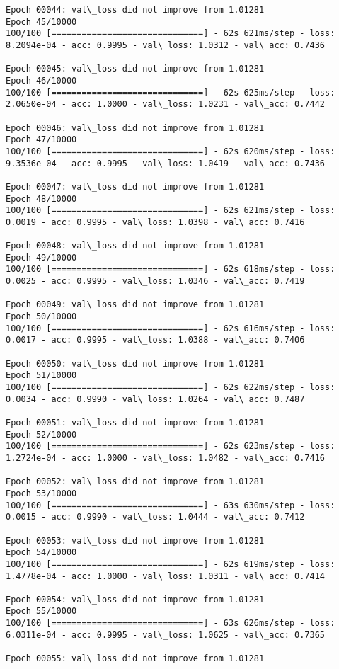 \documentclass[11pt]{article}
\begin{document}
\begin{Verbatim}[commandchars=\\\{\}]
Epoch 00044: val\_loss did not improve from 1.01281
Epoch 45/10000
100/100 [==============================] - 62s 621ms/step - loss: 8.2094e-04 - acc: 0.9995 - val\_loss: 1.0312 - val\_acc: 0.7436

Epoch 00045: val\_loss did not improve from 1.01281
Epoch 46/10000
100/100 [==============================] - 62s 625ms/step - loss: 2.0650e-04 - acc: 1.0000 - val\_loss: 1.0231 - val\_acc: 0.7442

Epoch 00046: val\_loss did not improve from 1.01281
Epoch 47/10000
100/100 [==============================] - 62s 620ms/step - loss: 9.3536e-04 - acc: 0.9995 - val\_loss: 1.0419 - val\_acc: 0.7436

Epoch 00047: val\_loss did not improve from 1.01281
Epoch 48/10000
100/100 [==============================] - 62s 621ms/step - loss: 0.0019 - acc: 0.9995 - val\_loss: 1.0398 - val\_acc: 0.7416

Epoch 00048: val\_loss did not improve from 1.01281
Epoch 49/10000
100/100 [==============================] - 62s 618ms/step - loss: 0.0025 - acc: 0.9995 - val\_loss: 1.0346 - val\_acc: 0.7419

Epoch 00049: val\_loss did not improve from 1.01281
Epoch 50/10000
100/100 [==============================] - 62s 616ms/step - loss: 0.0017 - acc: 0.9995 - val\_loss: 1.0388 - val\_acc: 0.7406

Epoch 00050: val\_loss did not improve from 1.01281
Epoch 51/10000
100/100 [==============================] - 62s 622ms/step - loss: 0.0034 - acc: 0.9990 - val\_loss: 1.0264 - val\_acc: 0.7487

Epoch 00051: val\_loss did not improve from 1.01281
Epoch 52/10000
100/100 [==============================] - 62s 623ms/step - loss: 1.2724e-04 - acc: 1.0000 - val\_loss: 1.0482 - val\_acc: 0.7416

Epoch 00052: val\_loss did not improve from 1.01281
Epoch 53/10000
100/100 [==============================] - 63s 630ms/step - loss: 0.0015 - acc: 0.9990 - val\_loss: 1.0444 - val\_acc: 0.7412

Epoch 00053: val\_loss did not improve from 1.01281
Epoch 54/10000
100/100 [==============================] - 62s 619ms/step - loss: 1.4778e-04 - acc: 1.0000 - val\_loss: 1.0311 - val\_acc: 0.7414

Epoch 00054: val\_loss did not improve from 1.01281
Epoch 55/10000
100/100 [==============================] - 63s 626ms/step - loss: 6.0311e-04 - acc: 0.9995 - val\_loss: 1.0625 - val\_acc: 0.7365

Epoch 00055: val\_loss did not improve from 1.01281

    \end{Verbatim}
\end{document}
